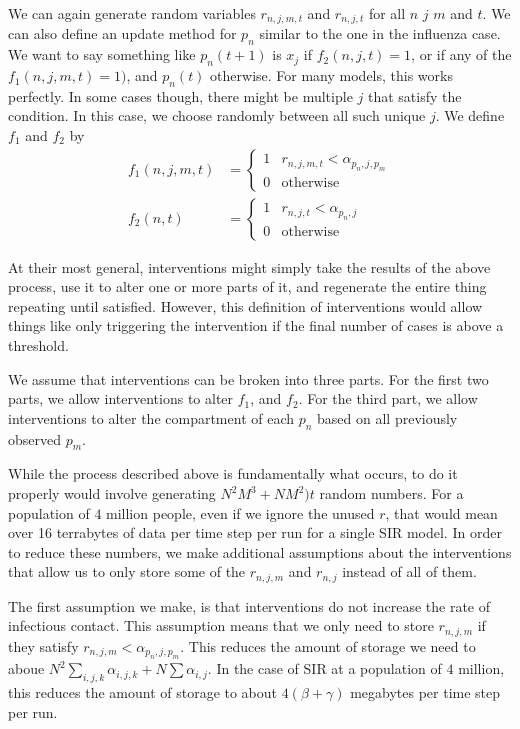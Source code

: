 \documentclass{article}
\begin{document}
We can again generate random variables $r_{n,j,m,t}$ and $r_{n,j,t}$ for all $n$ $j$ $m$ and $t$.  We can also define an update method for $p_n$ similar to the one in the influenza case.  We want to say something like $p_n(t+1)$ is $x_j$ if $f_2(n,j,t) = 1$, or if any of the $f_1(n,j,m,t) = 1)$, and $p_n(t)$ otherwise.  For many models, this works perfectly.  In some cases though, there might be multiple $j$ that satisfy the condition.  In this case, we choose randomly between all such unique $j$.  We define $f_1$ and $f_2$ by
\begin{align*}
   f_1(n,j,m,t) &= \begin{cases}
        1 & r_{n,j,m,t} < \alpha_{p_n,j,p_m}
     \\ 0 & \text{otherwise}
   \end{cases}
\\ f_2(n,t) &= \begin{cases}
        1 & r_{n,j,t} < \alpha_{p_n,j}
     \\ 0 & \text{otherwise}
   \end{cases}
\end{align*}

At their most general, interventions might simply take the results of the above process, use it to alter one or more parts of it, and regenerate the entire thing repeating until satisfied.  However, this definition of interventions would allow things like only triggering the intervention if the final number of cases is above a threshold.

We assume that interventions can be broken into three parts.  For the first two parts, we allow interventions to alter $f_1$, and $f_2$.  For the third part, we allow interventions to alter the compartment of each $p_n$ based on all previously observed $p_m$.  

While the process described above is fundamentally what occurs, to do it properly would involve generating $N^2 M^3 + N M^2)t$ random numbers.  For a population of $4$ million people, even if we ignore the unused $r$, that would mean over 16 terrabytes of data per time step per run for a single SIR model.  In order to reduce these numbers, we make additional assumptions about the interventions that allow us to only store some of the $r_{n,j,m}$ and $r_{n,j}$ instead of all of them.

The first assumption we make, is that interventions do not increase the rate of infectious contact.  This assumption means that we only need to store $r_{n,j,m}$ if they satisfy $r_{n,j,m} < \alpha_{p_n,j,p_m}$.  This reduces the amount of storage we need to aboue $N^2 \sum_{i,j,k} \alpha_{i,j,k} + N \sum \alpha_{i,j}$.  In the case of SIR at a population of $4$ million, this reduces the amount of storage to about $4(\beta + \gamma)$ megabytes per time step per run. %
\end{document}
